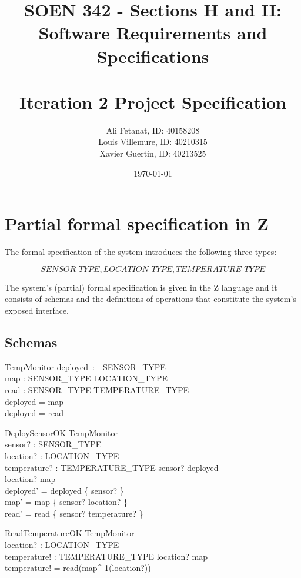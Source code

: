 \documentclass[12pt]{article}
\title{SOEN 342 - Sections H and II:\\Software Requirements and Specifications\\
	\ \\
	Iteration 2 Project Specification\\[20pt]}
\author{Ali Fetanat, ID: 40158208\\Louis Villemure, ID: 40210315\\Xavier Guertin, ID: 40213525\\[30pt]}
\date{\today}
\begin{document}
		\maketitle
		
		\newpage

		\section{Partial formal specification in Z}
		
		The formal specification of the system introduces the following three types:
		
		\[ SENSOR\_TYPE, LOCATION\_TYPE, TEMPERATURE\_TYPE  \]
		
		\noindent The system's (partial) formal specification is given in the Z language and it consists of schemas and the definitions of operations that constitute the system's exposed interface.
		
	
		\subsection{Schemas}
		
		
		\begin{schema}{TempMonitor}
			deployed~:~~SENSOR\_TYPE\\
			map : SENSOR\_TYPE \nrightarrow LOCATION\_TYPE\\
			read : SENSOR\_TYPE  \nrightarrow TEMPERATURE\_TYPE\\
			\where
			deployed = \dom map\\
			deployed = \dom read
		\end{schema}
		
		
		
		\begin{schema}{DeploySensorOK}
			\Delta TempMonitor\\
			sensor? : SENSOR\_TYPE\\
			location? : LOCATION\_TYPE\\
			temperature? : TEMPERATURE\_TYPE
			\where
			sensor? \notin deployed\\
			location? \notin \ran map\\
			deployed' = deployed \cup \{ sensor? \}\\
			map' = map \cup \{ sensor? \mapsto location? \}\\
			read' = read \cup \{ sensor? \mapsto temperature? \}
		\end{schema}
		
		
		\begin{schema}{ReadTemperatureOK}
			\Xi TempMonitor\\
			location? : LOCATION\_TYPE\\
			temperature! : TEMPERATURE\_TYPE
			\where
			location? \in \ran map\\
			temperature! = read(map^{-1}(location?))\\
		\end{schema}
		
\end{document}
